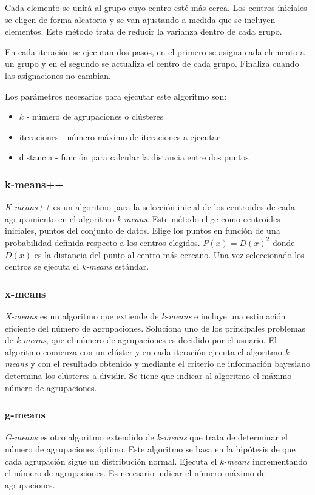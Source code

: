 Cada elemento se unirá al grupo cuyo centro esté más cerca. Los centros iniciales se eligen de forma aleatoria y se van ajustando a medida que se incluyen elementos. Este método trata de reducir la varianza dentro de cada grupo.

En cada iteración se ejecutan dos pasos, en el primero se asigna cada elemento a un grupo y en el segundo se actualiza el centro de cada grupo. Finaliza cuando las asignaciones no cambian.

Los parámetros necesarios para ejecutar este algoritmo son:
\begin{itemize}
	\tightlist
	\item $k$ - número de agrupaciones o clústeres
	\item iteraciones - número máximo de iteraciones a ejecutar
	\item distancia - función para calcular la distancia entre dos puntos
\end{itemize}

\subsubsection{k-means++}
\emph{K-means++} \cite{wiki:kmeans++} es un algoritmo para la selección inicial de los centroides de cada agrupamiento en el algoritmo \emph{k-means}. Este método elige como centroides iniciales, puntos del conjunto de datos. Elige los puntos en función de una probabilidad definida respecto a los centros elegidos. $P(x) = D(x)^{2}$ donde $D(x)$ es la distancia del punto al centro más cercano. Una vez seleccionado los centros se ejecuta el \emph{k-means} estándar.

\subsubsection{x-means}
\emph{X-means} \cite{Pelleg00x-means:extending} es un algoritmo que extiende de \emph{k-means} e incluye una estimación eficiente del número de agrupaciones. Soluciona uno de los principales problemas de \emph{k-means}, que el número de agrupaciones es decidido por el usuario. El algoritmo comienza con un clúster y en cada iteración ejecuta el algoritmo \emph{k-means} y con el resultado obtenido y mediante el criterio de información bayesiano determina los clústeres a dividir.
Se tiene que indicar al algoritmo el máximo número de agrupaciones.

\subsubsection{g-means}
\emph{G-means} es otro algoritmo extendido de \emph{k-means} que trata de determinar el número de agrupaciones óptimo. Este algoritmo se basa en la hipótesis de que cada agrupación sigue un distribución normal. Ejecuta el \emph{k-means} incrementando el número de agrupaciones. Es necesario indicar el número máximo de agrupaciones.

